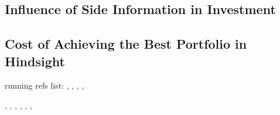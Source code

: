\documentclass[10pt, twocolumn]{IEEEtran}
\begin{document}
\subsection{Influence of Side Information in Investment}
\subsection{Cost of Achieving the Best Portfolio in Hindsight}





running refs list: \cite{RePEc:eee:monchp:3-04}, \cite{Burnham2011}, \cite{Cover2005}, \cite{Cover1988},

\cite{Cover1998}, \cite{Li2017}, \cite{Sims2003}, \cite{Woodford2009}, \cite{Hansen2010}, \cite{StochasticGames},

\cite{Pesaran1995}


 
\baselineskip=2pt


\end{document}
